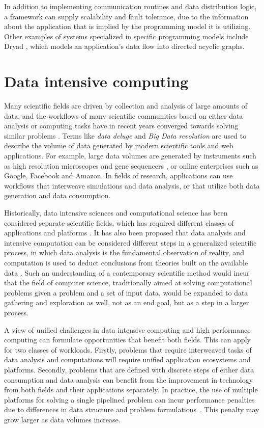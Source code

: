 \documentclass{uit-report}
\begin{document}
In addition to implementing communication routines and data distribution logic, a framework can supply scalability and fault tolerance, due to the information about the application that is implied by the programming model it is utilizing. Other examples of systems specialized in specific programming models include Dryad \cite{dryad}, which models an application's data flow into directed acyclic graphs.

\section{Data intensive computing}
Many scientific fields are driven by collection and analysis of large amounts of data, and the workflows of many scientific communities based on either data analysis or computing tasks have in recent years converged towards solving similar problems \cite{bigdataconvergence}. Terms like \emph{data deluge} and \emph{Big Data revolution} are used to describe the volume of data generated by modern scientific tools and web applications. For example, large data volumes are generated by instruments such as high resolution microscopes \cite{microscopy} and gene sequencers \cite{mapreduce_locality}, or online enterprises such as Google, Facebook and Amazon. In fields of research, applications can use workflows that interweave simulations and data analysis, or that utilize both data generation and data consumption. 

Historically, data intensive sciences and computational science has been considered separate scientific fields, which has required different classes of applications and platforms \cite{Hey2009JimGO}. It has also been proposed that data analysis and intensive computation can be considered different steps in a generalized scientific process, in which data analysis is the fundamental observation of reality, and computation is used to deduct conclusions from theories built on the available data \cite{honavar2016accelerating}. Such an understanding of a contemporary scientific method would incur that the field of computer science, traditionally aimed at solving computational problems given a problem and a set of input data, would be expanded to data gathering and exploration as well, not as an end goal, but as a step in a larger process.

A view of unified challenges in data intensive computing and high performance computing can formulate opportunities that benefit both fields. This can apply for two classes of workloads. Firstly, problems that require interweaved tasks of data analysis and computations will require unified application ecosystems and platforms. Secondly, problems that are defined with discrete steps of either data consumption and data analysis can benefit from the improvement in technology from both fields and their applications separately. In practice, the use of multiple platforms for solving a single pipelined problem can incur performance penalties due to differences in data structure and problem formulations~\cite{husky}. This penalty may grow larger as data volumes increase.
\end{document}
